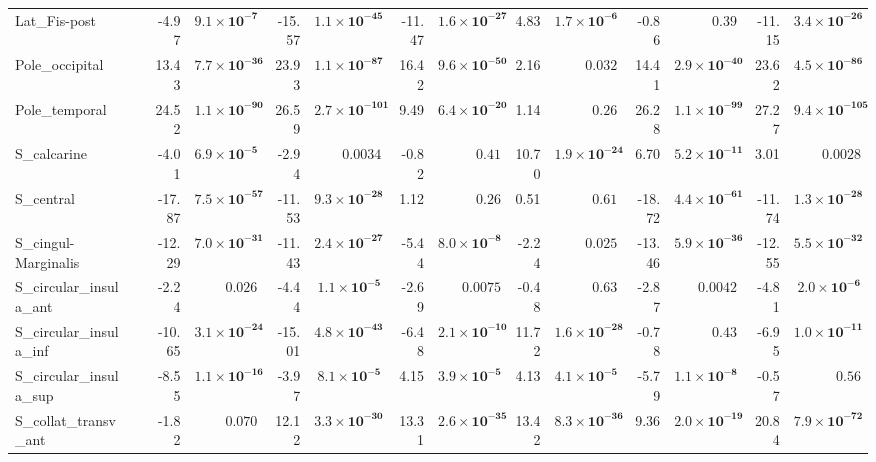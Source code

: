 {\begin{longtable}{llrrrrrrrrrrrr}
Lat\_Fis-post &  & -4.97 & $\mathbf{9.1{\times}10^{-7}}$ & -15.57 & $\mathbf{1.1{\times}10^{-45}}$ & -11.47 & $\mathbf{1.6{\times}10^{-27}}$ & 4.83 & $\mathbf{1.7{\times}10^{-6}}$ & -0.86 & $0.39$ & -11.15 & $\mathbf{3.4{\times}10^{-26}}$ \\
Pole\_occipital &  & 13.43 & $\mathbf{7.7{\times}10^{-36}}$ & 23.93 & $\mathbf{1.1{\times}10^{-87}}$ & 16.42 & $\mathbf{9.6{\times}10^{-50}}$ & 2.16 & $0.032$ & 14.41 & $\mathbf{2.9{\times}10^{-40}}$ & 23.62 & $\mathbf{4.5{\times}10^{-86}}$ \\
Pole\_temporal &  & 24.52 & $\mathbf{1.1{\times}10^{-90}}$ & 26.59 & $\mathbf{2.7{\times}10^{-101}}$ & 9.49 & $\mathbf{6.4{\times}10^{-20}}$ & 1.14 & $0.26$ & 26.28 & $\mathbf{1.1{\times}10^{-99}}$ & 27.27 & $\mathbf{9.4{\times}10^{-105}}$ \\
S\_calcarine &  & -4.01 & $\mathbf{6.9{\times}10^{-5}}$ & -2.94 & $0.0034$ & -0.82 & $0.41$ & 10.70 & $\mathbf{1.9{\times}10^{-24}}$ & 6.70 & $\mathbf{5.2{\times}10^{-11}}$ & 3.01 & $0.0028$ \\
S\_central &  & -17.87 & $\mathbf{7.5{\times}10^{-57}}$ & -11.53 & $\mathbf{9.3{\times}10^{-28}}$ & 1.12 & $0.26$ & 0.51 & $0.61$ & -18.72 & $\mathbf{4.4{\times}10^{-61}}$ & -11.74 & $\mathbf{1.3{\times}10^{-28}}$ \\
S\_cingul-Marginalis &  & -12.29 & $\mathbf{7.0{\times}10^{-31}}$ & -11.43 & $\mathbf{2.4{\times}10^{-27}}$ & -5.44 & $\mathbf{8.0{\times}10^{-8}}$ & -2.24 & $0.025$ & -13.46 & $\mathbf{5.9{\times}10^{-36}}$ & -12.55 & $\mathbf{5.5{\times}10^{-32}}$ \\
S\_circular\_insula\_ant &  & -2.24 & $0.026$ & -4.44 & $\mathbf{1.1{\times}10^{-5}}$ & -2.69 & $0.0075$ & -0.48 & $0.63$ & -2.87 & $0.0042$ & -4.81 & $\mathbf{2.0{\times}10^{-6}}$ \\
S\_circular\_insula\_inf &  & -10.65 & $\mathbf{3.1{\times}10^{-24}}$ & -15.01 & $\mathbf{4.8{\times}10^{-43}}$ & -6.48 & $\mathbf{2.1{\times}10^{-10}}$ & 11.72 & $\mathbf{1.6{\times}10^{-28}}$ & -0.78 & $0.43$ & -6.95 & $\mathbf{1.0{\times}10^{-11}}$ \\
S\_circular\_insula\_sup &  & -8.55 & $\mathbf{1.1{\times}10^{-16}}$ & -3.97 & $\mathbf{8.1{\times}10^{-5}}$ & 4.15 & $\mathbf{3.9{\times}10^{-5}}$ & 4.13 & $\mathbf{4.1{\times}10^{-5}}$ & -5.79 & $\mathbf{1.1{\times}10^{-8}}$ & -0.57 & $0.56$ \\
S\_collat\_transv\_ant &  & -1.82 & $0.070$ & 12.12 & $\mathbf{3.3{\times}10^{-30}}$ & 13.31 & $\mathbf{2.6{\times}10^{-35}}$ & 13.42 & $\mathbf{8.3{\times}10^{-36}}$ & 9.36 & $\mathbf{2.0{\times}10^{-19}}$ & 20.84 & $\mathbf{7.9{\times}10^{-72}}$ \\

\end{longtable}}

